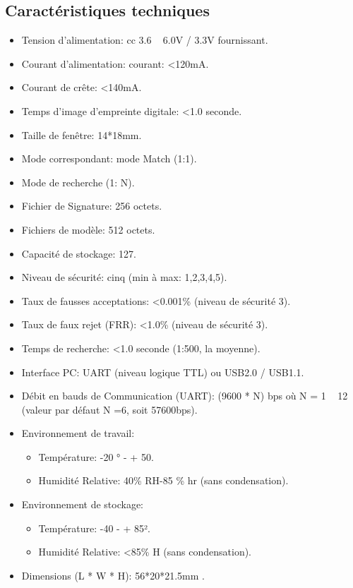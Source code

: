 \subsection{Caractéristiques techniques }
\begin{itemize}
    \item Tension d'alimentation: cc 3.6 ~ 6.0V / 3.3V fournissant.
    \item Courant d'alimentation: courant: <120mA.
    \item Courant de crête: <140mA.
    \item Temps d'image d'empreinte digitale: <1.0 seconde.
    \item Taille de fenêtre: 14*18mm.
    \item Mode correspondant: mode Match (1:1).
    \item Mode de recherche (1: N).
    \item Fichier de Signature: 256 octets.
    \item Fichiers de modèle: 512 octets.
    \item Capacité de stockage: 127.
    \item Niveau de sécurité: cinq (min à max: 1,2,3,4,5).
    \item Taux  de fausses acceptations: <0.001\% (niveau de sécurité 3).
    \item Taux de faux rejet (FRR): <1.0\% (niveau de sécurité 3).
    \item Temps de recherche: <1.0 seconde (1:500, la moyenne).
    \item Interface PC: UART (niveau logique TTL) ou USB2.0 / USB1.1.
    \item Débit en bauds de Communication (UART): (9600 * N) bps où N = 1 ~ 12 
        (valeur par défaut N =6, soit 57600bps).
    \item Environnement de travail:
        \begin{itemize}
            \item [\textbullet]Température: -20 ° - + 50.
            \item [\textbullet]Humidité Relative: 40\% RH-85 \% hr (sans condensation).
        \end{itemize}
    \item Environnement de stockage:
        \begin{itemize}
            \item [\textbullet] Température: -40 - + 85².
            \item [\textbullet] Humidité Relative: <85\% H (sans condensation).
        \end{itemize}
    \item Dimensions (L * W * H): 56*20*21.5mm .
\end{itemize}

